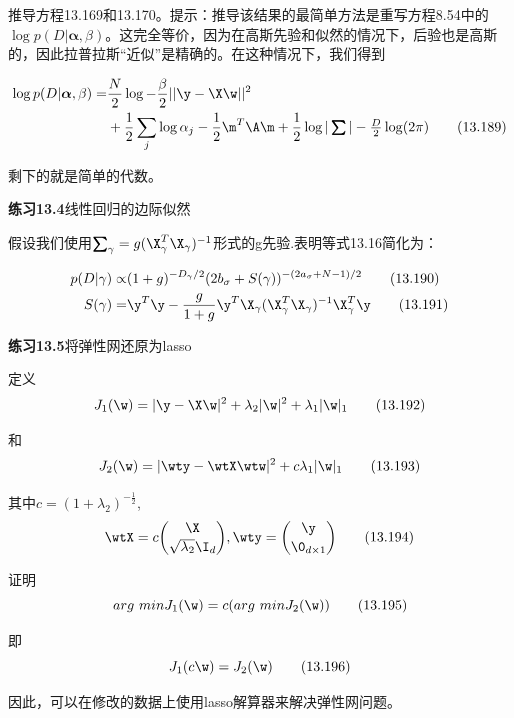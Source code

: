 \documentclass[a4paper]{article}
\begin{document}
推导方程13.169和13.170。提示：推导该结果的最简单方法是重写方程8.54中的$\log p(D|\boldsymbol{\alpha},\beta)$。这完全等价，因为在高斯先验和似然的情况下，后验也是高斯的，因此拉普拉斯“近似”是精确的。在这种情况下，我们得到

\begin{align}
	\log p(D|\boldsymbol{\alpha},\beta)=&\frac{N}{2}\log -\frac{\beta}{2}||\y-\X\w||^2\tag*{}\\
	&+\frac{1}{2}\sum_{j}\log \alpha_j-\frac{1}{2}\m^T\A\m+\frac{1}{2}\log |\boldsymbol{\textstyle\sum}|-\frac{D}{2}\log (2\pi)\tag{13.189}
\end{align}

剩下的就是简单的代数。

\textbf{练习13.4}线性回归的边际似然

假设我们使用$\boldsymbol{\textstyle\sum}_\gamma=g(\X_{\gamma}^T\X_{\gamma})^{-1}$形式的g先验.表明等式13.16简化为：

\begin{align}
	p(D|\gamma)\propto& (1+g)^{-D_\gamma/2}(2b_\sigma+S(\gamma))^{-(2a_{\sigma}+N-1)/2}\tag{13.190}\\
	S(\gamma)=& \y^T\y-\frac{g}{1+g}\y^T\X_{\gamma}(\X_{\gamma}^T\X_{\gamma})^{-1}\X_{\gamma}^T\y\tag{13.191}
\end{align}

\textbf{练习13.5}将弹性网还原为lasso

定义
\begin{equation}
	J_1(\w)=|\y-\X\w|^2+\lambda_2|\w|^2+\lambda_1|\w|_1\tag{13.192}
\end{equation}

和
\begin{equation}
	J_2(\w)=|\wty-\wtX\wtw|^2+c\lambda_1|\w|_1\tag{13.193}
\end{equation}

其中$c=(1+\lambda_2)^{-\frac{1}{2}}$,
\begin{equation}
	\boldsymbol{\wtX}=c\binom{\X}{\sqrt{\lambda_2}\I_d},\boldsymbol{\wty}=\binom{\y}{\0_{d\times 1}}\tag{13.194}
\end{equation}

证明
\begin{equation}
	arg\  min J_1(\w)=c(arg\ min J_2(\w))\tag{13.195}
\end{equation}

即
\begin{equation}
	J_1(c\w)=J_2(\w)\tag{13.196}
\end{equation}

因此，可以在修改的数据上使用lasso解算器来解决弹性网问题。
\end{document}
